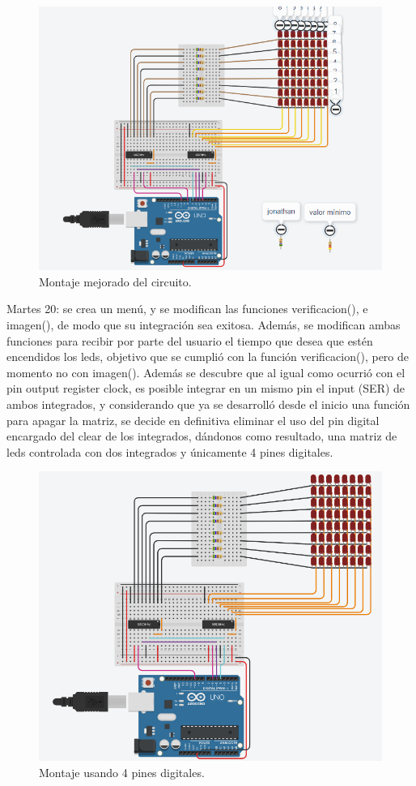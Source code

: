 \documentclass{article}
\begin{document}
 \begin{figure}[h]
\includegraphics[scale=0.5]{montaje2.png}
\centering
\caption{Montaje mejorado del circuito.}
\label{fig:montaje2}
\end{figure}
 
Martes 20: se crea un menú, y se modifican las funciones verificacion(), e imagen(),  de modo que su integración sea exitosa. Además, se modifican ambas funciones para recibir por parte del usuario el tiempo que desea que estén encendidos los leds, objetivo que se cumplió con la función verificacion(), pero de momento no con imagen(). Además se descubre que al igual como ocurrió con el pin output register clock, es posible integrar en un mismo pin el input (SER) de ambos integrados, y considerando que ya se desarrolló desde el inicio una función para apagar la matriz, se decide en definitiva eliminar el uso del pin digital encargado del clear de los integrados, dándonos como resultado, una matriz de leds controlada con  dos integrados y únicamente 4 pines digitales.

 \begin{figure}[h]
\includegraphics[scale=0.4]{montaje 4 final.png}
\centering
\caption{Montaje usando 4 pines digitales.}
\label{fig:montaje4}
\end{figure}
\end{document}

